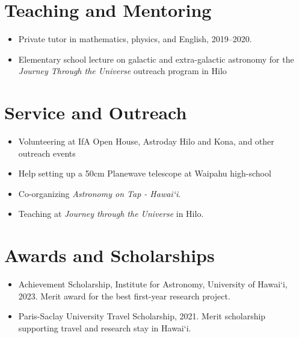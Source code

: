 \documentclass[11pt,letterpaper]{article}
\begin{document}

\section{Teaching and Mentoring}
\begin{itemize}
  \item Private tutor in mathematics, physics, and English, 2019--2020.
  \item Elementary school lecture on galactic and extra-galactic astronomy for the \textit{Journey Through the Universe} outreach program in Hilo
\end{itemize}


\section{Service and Outreach}
\begin{itemize}
  \item Volunteering at IfA Open House, Astroday Hilo and Kona, and other outreach events
  \item Help setting up a 50cm Planewave telescope at Waipahu high-school
  \item Co-organizing \textit{Astronomy on Tap - Hawai`i}.
  \item Teaching at \textit{Journey through the Universe} in Hilo.
\end{itemize}


\section{Awards and Scholarships}
\begin{itemize}
  \item Achievement Scholarship, Institute for Astronomy, University of Hawai`i, 2023. Merit award for the best first-year research project.
  \item Paris-Saclay University Travel Scholarship, 2021. Merit scholarship supporting travel and research stay in Hawai`i.
\end{itemize}

\end{document}
